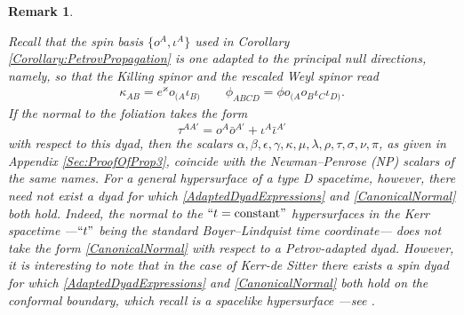 \documentclass[10pt,a4paper]{article}
\theoremstyle{plain}
\newtheorem{remark}{Remark}
\begin{document}
\begin{remark}\label{Remark:DyadRelations}
  {\em Recall that the spin basis $\{o^A, \iota^A\}$ used in Corollary
    \ref{Corollary:PetrovPropagation} is one adapted to the
    principal null directions, namely, so that the Killing spinor and the
    rescaled Weyl spinor read
    \begin{align}\label{AdaptedDyadExpressions}
\kappa_{AB}=e^\varkappa o_{(A}\iota_{B)} \qquad \phi_{ABCD}=\phi 
o_{(A}o_{B}\iota_{C}\iota_{D)}.
    \end{align}
If the normal to the foliation takes the form 
\begin{equation}\label{CanonicalNormal}
\tau^{AA'}=o^A\bar{o}^{A'}+\iota^A\bar{\iota}^{A'}
\end{equation}
with respect to this dyad, then the scalars $\alpha, \beta,
\epsilon, \gamma, \kappa, \mu, \lambda, \rho, \tau, \sigma, \nu, \pi$, as given in Appendix \ref{Sec:ProofOfProp3}, coincide with the 
 Newman--Penrose (NP) scalars of the same names. For a general hypersurface of a type D spacetime, however, there need not exist 
a dyad for which \eqref{AdaptedDyadExpressions} and \eqref{CanonicalNormal} both hold. 
Indeed, the normal to the $``t=\text{constant}"$ hypersurfaces in the Kerr spacetime ---$``t"$
 being the standard Boyer--Lindquist time coordinate--- does not take the form \eqref{CanonicalNormal}
 with respect to a Petrov-adapted dyad. 
 However, it is interesting to note that in the case of Kerr-de Sitter there exists a spin dyad for which
 \eqref{AdaptedDyadExpressions} and \eqref{CanonicalNormal} both hold \emph{on the conformal boundary}, 
 which recall is a spacelike hypersurface ---see \cite{GasThesis}. 

}
\end{remark}
\end{document}
